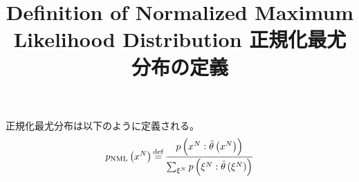 \documentclass{jsarticle}
\title{Definition of Normalized Maximum Likelihood Distribution \newline 正規化最尤分布の定義}
\begin{document}
\maketitle
正規化最尤分布は以下のように定義される。
\begin{equation}
    p_\mathrm{NML} \left( x^N \right) \mathop{=}\limits^{\mathrm{def}} \frac{p \left( x^N: \hat{\theta} \left( x^N \right) \right)}{\sum_{\xi^N} p \left( \xi^N: \hat{\theta} \left( \xi^N \right) \right)}
\end{equation}
\end{document}
